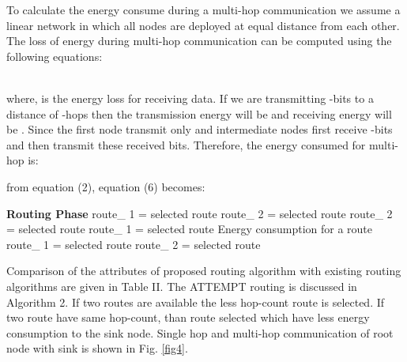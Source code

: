 \documentclass[journal]{IEEEtran}
\begin{document}
To calculate the energy consume during a multi-hop communication we assume a linear network in which all nodes are deployed at equal distance from each other. The loss of energy during multi-hop communication can be computed using the following equations:


\\
where,  is the energy loss for receiving data. If we are transmitting -bits to a distance of -hops then the transmission energy will be  and receiving energy will be . Since the first node transmit only and intermediate nodes first receive -bits and then transmit these received bits. Therefore, the energy consumed for multi-hop is:




from equation (2), equation (6) becomes:






\begin{algorithm}[H]
\caption{: ATTEMPT Routing}
\begin{algorithmic}[1]
\STATE \textbf{Routing Phase}
                \STATE route\_  1 = selected route
              \ELSE
               \STATE route\_  2 = selected route
                \STATE route\_  2 = selected route
              \ELSE
               \STATE route\_  1 = selected route
               \STATE  Energy consumption for a route
                \STATE route\_  1 = selected route
              \ELSE
               \STATE route\_  2 = selected route
                          \ENDIF
                          \ENDIF
                          \ENDIF
                             \ENDIF
                          \end{algorithmic}
                           \end{algorithm}





Comparison of the attributes of proposed routing algorithm with existing routing algorithms are given in Table II. The ATTEMPT routing is discussed in Algorithm 2. If two routes are available the less hop-count route is selected. If two route have same hop-count, than route selected which have less energy consumption to the sink node. Single hop and multi-hop communication of root node with sink is shown in Fig. \ref{fig4}.

\begin{figure*}[ht]
  \centering
  \caption{Energy management for single-hop and multi-hop communication}\label{fig4}
\end{figure*}
\end{document}
